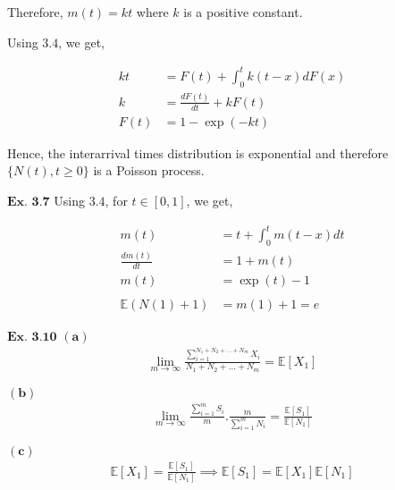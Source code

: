 \documentclass{article}
\begin{document}
Therefore, $m(t) = kt$ where $k$ is a positive constant.

Using $\mathbf{3.4}$, we get,

\begin{align*}
kt &= F(t) + \int_{0}^{t}k(t-x)dF(x)\\
k &= \frac{dF(t)}{dt} + kF(t)\\
F(t) &= 1-\exp(-kt)
\end{align*}

Hence, the interarrival times distribution is exponential and therefore $\{N(t),t\geq 0\}$ is a Poisson process.

\vspace{0.2in}
${\textbf{Ex. 3.7}}$
Using $\mathbf{3.4}$, for $t \in [0,1]$, we get,

\begin{align*}
m(t) &= t + \int_{0}^{t}m(t-x)dt\\
\frac{dm(t)}{dt} &= 1 + m(t)\\
m(t) &= \exp(t)-1\\\\
\mathbb{E}(N(1)+1) &= m(1)+1 = e
\end{align*}

\vspace{0.2in}
\begin{comment}
${\textbf{Ex. 3.8}}$

\vspace{0.2in}
${\textbf{Ex. 3.9}}$

\vspace{0.2in}
\end{comment}
${\textbf{Ex. 3.10}}$
$\mathbf{(a)}$
\begin{align*}
\lim_{m\rightarrow\infty} \frac{\sum\limits_{i=1}^{N_1+N_2+\ldots+N_m}X_i}{N_1+N_2+\ldots+N_m} = \mathbb{E}[X_1]
\end{align*}

$\mathbf{(b)}$
\begin{align*}
\lim_{m\rightarrow\infty} \frac{\sum\limits_{i=1}^{m}S_i}{m}.\frac{m}{\sum\limits_{i=1}^{m}N_i} = \frac{\mathbb{E}[S_1]}{\mathbb{E}[N_1]}
\end{align*}

$\mathbf{(c)}$
\begin{align*}
\mathbb{E}[X_1] = \frac{\mathbb{E}[S_1]}{\mathbb{E}[N_1]} \implies \mathbb{E}[S_1] = \mathbb{E}[X_1]\mathbb{E}[N_1]
\end{align*}
\end{document}
